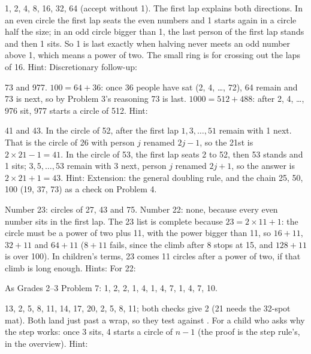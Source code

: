 1, 2, 4, 8, 16, 32, 64 (accept without 1). The first lap explains both directions. In an even circle the first lap seats the even numbers and 1 starts again in a circle half the size; in an odd circle bigger than 1, the last person of the first lap stands and then 1 sits. So 1 is last exactly when halving never meets an odd number above 1, which means a power of two. The small ring is for crossing out the laps of 16. Hint:  Discretionary follow-up: 

73 and 977. $100=64+36$: once 36 people have sat (2, 4, \dots, 72), 64 remain and 73 is next, so by Problem 3's reasoning 73 is last. $1000=512+488$: after 2, 4, \dots, 976 sit, 977 starts a circle of 512. Hint: 

41 and 43. In the circle of 52, after the first lap $1,3,\dots,51$ remain with 1 next. That is the circle of 26 with person $j$ renamed $2j-1$, so the 21st is $2\times21-1=41$. In the circle of 53, the first lap seats 2 to 52, then 53 stands and 1 sits; $3,5,\dots,53$ remain with 3 next, person $j$ renamed $2j+1$, so the answer is $2\times21+1=43$. Hint:  Extension: the general doubling rule, and the chain 25, 50, 100 (19, 37, 73) as a check on Problem 4.

Number 23: circles of 27, 43 and 75. Number 22: none, because every even number sits in the first lap. The 23 list is complete because $23=2\times11+1$: the circle must be a power of two plus 11, with the power bigger than 11, so $16+11$, $32+11$ and $64+11$ ($8+11$ fails, since the climb after 8 stops at 15, and $128+11$ is over 100). In children's terms, 23 comes 11 circles after a power of two, if that climb is long enough. Hints:  For 22: 

As Grades 2--3 Problem 7: 1, 2, 2, 1, 4, 1, 4, 7, 1, 4, 7, 10.

13, 2, 5, 8, 11, 14, 17, 20, 2, 5, 8, 11; both checks give 2 (21 needs the 32-spot mat). Both land just past a wrap, so they test  against . For a child who asks why the step works: once 3 sits, 4 starts a circle of $n-1$ (the proof is the step rule's, in the overview). Hint: 

